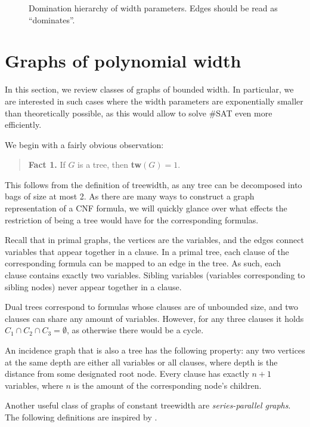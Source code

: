 \documentclass{article}
\begin{document}
\begin{figure}
	\centering
	
	\caption{Domination hierarchy of width parameters. Edges should be read as ``dominates''.}
	\label{fig:hierarchy}
\end{figure}

\section{Graphs of polynomial width}

In this section, we review classes of graphs of bounded width.
In particular, we are interested in such cases where the width parameters are exponentially smaller than theoretically possible, as this would allow to solve \#SAT even more efficiently.

We begin with a fairly obvious observation:

\begin{quote}
	\textbf{Fact 1.}
	If $G$ is a tree, then \textbf{tw}$(G) = 1$. 
\end{quote}

\noindent
This follows from the definition of treewidth, as any tree can be decomposed into bags of size at most 2.
As there are many ways to construct a graph representation of a CNF formula, we will quickly glance over what effects the restriction of being a tree would have for the corresponding formulas.

Recall that in primal graphs, the vertices are the variables, and the edges connect variables that appear together in a clause.
In a primal tree, each clause of the corresponding formula can be mapped to an edge in the tree.
As such, each clause contains exactly two variables.
Sibling variables (variables corresponding to sibling nodes) never appear together in a clause.

Dual trees correspond to formulas whose clauses are of unbounded size, and two clauses can share any amount of variables. However, for any three clauses it holds $C_1 \cap C_2 \cap C_3 = \emptyset$, as otherwise there would be a cycle.

An incidence graph that is also a tree has the following property: any two vertices at the same depth are either all variables or all clauses, where depth is the distance from some designated root node.
Every clause has exactly $n+1$ variables, where $n$ is the amount of the corresponding node's children.

Another useful class of graphs of constant treewidth are {\em series-parallel graphs}. The following definitions are inspired by \cite{DBLP:journals/corr/abs-2004-00547}.
\end{document}
